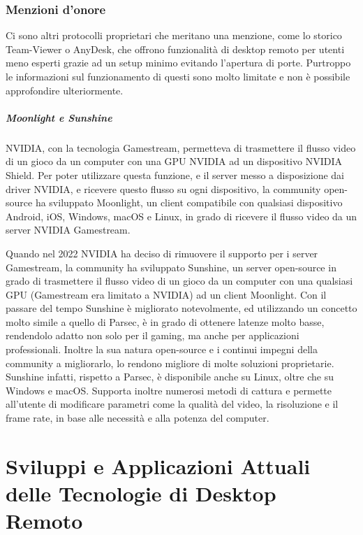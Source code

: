 \documentclass[12pt,a4paper,openright,twoside]{book}
\begin{document}
\subsection{Menzioni d'onore}
Ci sono altri protocolli proprietari che meritano una menzione, come lo storico Team-Viewer o AnyDesk, che offrono funzionalità di desktop remoto per utenti meno esperti grazie ad un setup minimo evitando l'apertura di porte. Purtroppo le informazioni sul funzionamento di questi sono molto limitate e non è possibile approfondire ulteriormente.

\paragraph{Moonlight e Sunshine}
NVIDIA, con la tecnologia Gamestream, permetteva di trasmettere il flusso video di un gioco da un computer con una GPU NVIDIA ad un dispositivo NVIDIA Shield. Per poter utilizzare questa funzione, e il server messo a disposizione dai driver NVIDIA, e ricevere questo flusso su ogni dispositivo, la community open-source ha sviluppato Moonlight, un client compatibile con qualsiasi dispositivo Android, iOS, Windows, macOS e Linux, in grado di ricevere il flusso video da un server NVIDIA Gamestream.

Quando nel 2022 NVIDIA ha deciso di rimuovere il supporto per i server Gamestream, la community ha sviluppato Sunshine, un server open-source in grado di trasmettere il flusso video di un gioco da un computer con una qualsiasi GPU (Gamestream era limitato a NVIDIA) ad un client Moonlight.
Con il passare del tempo Sunshine è migliorato notevolmente, ed utilizzando un concetto molto simile a quello di Parsec, è in grado di ottenere latenze molto basse, rendendolo adatto non solo per il gaming, ma anche per applicazioni professionali. Inoltre la sua natura open-source e i continui impegni della community a migliorarlo, lo rendono migliore di molte soluzioni proprietarie. Sunshine infatti, rispetto a Parsec, è disponibile anche su Linux, oltre che su Windows e macOS. Supporta inoltre numerosi metodi di cattura e permette all'utente di modificare parametri come la qualità del video, la risoluzione e il frame rate, in base alle necessità e alla potenza del computer.

\chapter{Sviluppi e Applicazioni Attuali delle Tecnologie di Desktop Remoto}
\label{chap:current-applications}
\end{document}
